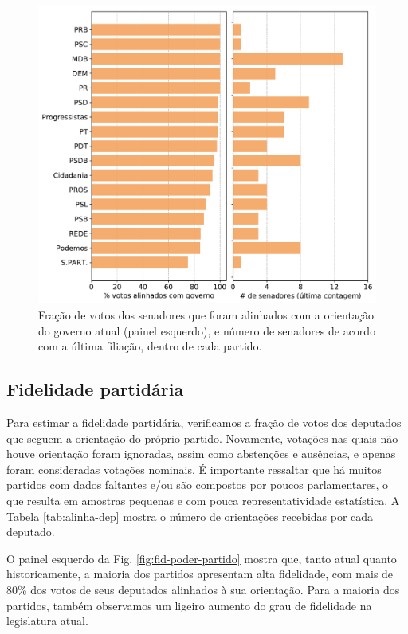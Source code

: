 \documentclass[12pt,a4paper]{article}
\begin{document}
\begin{figure}[H]
\centering
\includegraphics[width=1.0\textwidth]{graficos/senado/apoio_senado_ao_governo_partidos+tamanho_2019-05-09.pdf}
\caption{Fração de votos dos senadores que foram alinhados com a orientação do governo atual (painel esquerdo), e
  número de senadores de acordo com a última filiação, dentro de cada partido.}
\label{fig:apoio-governo-partido-senado}
\end{figure} 

\subsection{Fidelidade partidária}

Para estimar a fidelidade partidária, verificamos a fração de votos dos deputados que seguem
a orientação do próprio partido. Novamente, votações nas quais não houve orientação foram
ignoradas, assim como abstenções e ausências, e apenas foram consideradas votações nominais. É importante ressaltar que há muitos partidos com dados faltantes e/ou são compostos
por poucos parlamentares, o que resulta em amostras pequenas e com pouca representatividade estatística. 
A Tabela \ref{tab:alinha-dep} mostra o número de orientações recebidas por cada deputado.

O painel esquerdo da Fig. \ref{fig:fid-poder-partido} mostra que, tanto atual quanto historicamente, a maioria dos partidos
apresentam alta fidelidade, com mais de 80\% dos votos de seus deputados alinhados à sua orientação.
Para a maioria dos partidos, também observamos um ligeiro aumento do grau de fidelidade na legislatura atual.
\end{document}
